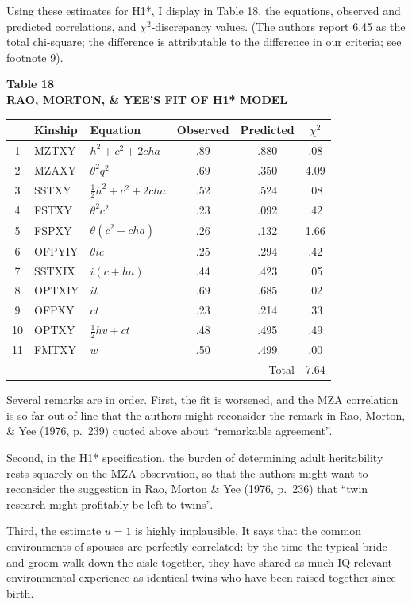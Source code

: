 ﻿\documentclass[12pt]{article}
\begin{document}
Using these estimates for H1*, I display in Table 18, the equations, observed and predicted correlations, and $\chi^2$-discrepancy values. (The authors report 6.45 as the total chi-square; the difference is attributable to the difference in our criteria; see footnote 9).

\begin{center}
\textbf{Table 18}\\
\textbf{RAO, MORTON, \& YEE'S FIT OF H1* MODEL}
\end{center}
\begin{center}
\small
\begin{tabular}{c l l c c c}
\hline
 & Kinship & Equation & Observed & Predicted & $\chi^2$ \\
\hline
1 & MZTXY & $h^2+c^2+2cha$ & .89 & .880 & .08 \\
2 & MZAXY & $\theta^2q^2$ & .69 & .350 & 4.09 \\
3 & SSTXY & $\tfrac12h^2+c^2+2cha$ & .52 & .524 & .08 \\
4 & FSTXY & $\theta^2c^2$ & .23 & .092 & .42 \\
5 & FSPXY & $\theta(c^2+cha)$ & .26 & .132 & 1.66 \\
6 & OFPYIY & $\theta ic$ & .25 & .294 & .42 \\
7 & SSTXIX & $i(c+ha)$ & .44 & .423 & .05 \\
8 & OPTXIY & $it$ & .69 & .685 & .02 \\
9 & OFPXY & $ct$ & .23 & .214 & .33 \\
10 & OPTXY & $\tfrac12hv+ct$ & .48 & .495 & .49 \\
11 & FMTXY & $w$ & .50 & .499 & .00 \\
\hline
\multicolumn{5}{r}{Total} & 7.64 \\
\hline
\end{tabular}
\end{center}

Several remarks are in order. First, the fit is worsened, and the MZA correlation is so far out of line that the authors might reconsider the remark in Rao, Morton, \& Yee (1976, p.\ 239) quoted above about ``remarkable agreement''.

Second, in the H1* specification, the burden of determining adult heritability rests squarely on the MZA observation, so that the authors might want to reconsider the suggestion in Rao, Morton \& Yee (1976, p.\ 236) that ``twin research might profitably be left to twins''.

Third, the estimate $u=1$ is highly implausible. It says that the common environments of spouses are perfectly correlated: by the time the typical bride and groom walk down the aisle together, they have shared as much IQ-relevant environmental experience as identical twins who have been raised together since birth.
\end{document}
